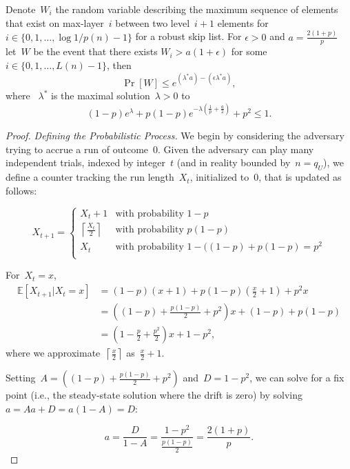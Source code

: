 \begin{lemma}\label{lemma:rsllb}
Denote~$W_i$ the random variable describing the maximum sequence of elements that exist on max-layer~$i$ between two level~$i+1$ elements for~$i \in \{0,1,\ldots,\log{1/p}(n)-1\}$ for a robust skip list. For $\epsilon>0$ and $a=\frac{2(1+p)}{p}$ let~$W$ be the event that there exists $W_i> a(1+\epsilon)$ for some $i \in \{0,1,\ldots,L(n)-1\}$, then
\[\Pr[W]  \leq e^{(\lambda^{*}a) - (\epsilon\lambda^{*}a)},\]
where ~$\lambda^{*}$ is the maximal solution~$\lambda > 0$ to
$$(1-p)e^{\lambda} + p(1-p)e^{-\lambda \left(\frac{1}{p} + \frac{a}{2} \right)} + p^2 \leq 1 .$$
\end{lemma}

\begin{proof}
\textit{Defining the Probabilistic Process.} We begin by considering the adversary trying to accrue a run of outcome~$0$. Given the adversary can play many independent trials, indexed by integer~$t$ (and in reality bounded by~$n=q_U$), we define a counter tracking the run length~$X_t$, initialized to~$0$, that is updated as follows:

    \[ X_{t+1} = \begin{cases} 
          X_t +1 & \text{with probability } 1-p \\
           \left\lceil \frac{X_t}{2} \right\rceil & \text{with probability } p(1-p) \\
          X_t & \text{with probability } 1 - ((1-p) + p(1-p) = p^2 \\
       \end{cases}
    \]

For~$X_t = x$,
\begin{align*}
    \mathbb{E}[X_{t+1} | X_t = x] &= (1-p)(x+1) + p(1-p)(\frac{x}{2} +1) + p^2x \\
    &= \left((1-p)+\frac{p(1-p)}{2}+p^2\right)x + (1-p)+p(1-p) \\
    & = \left(1 - \frac{p}{2} + \frac{p^2}{2} \right)x + 1-p^2,
\end{align*}
where we approximate~$\left\lceil \frac{x}{2} \right\rceil$ as~$\frac{x}{2} + 1$.

Setting~$A = \left((1-p)+\frac{p(1-p)}{2}+p^2\right)$ and~$D = 1-p^2$, we can solve for a fix point (i.e., the steady-state solution where the drift is zero) by solving~$a = Aa + D = a(1-A) = D$:

$$a = \frac{D}{1-A} = \frac{1-p^2}{\frac{p(1-p)}{2}} = \frac{2(1+p)}{p}.$$


\end{proof}
